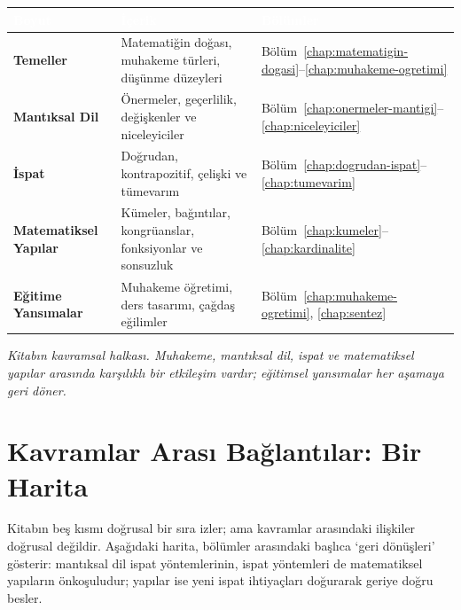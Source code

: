 \par\smallskip\begin{center}{\renewcommand{\arraystretch}{1.25}\footnotesize\begin{tabular}{|>{\raggedright\arraybackslash}p{2.59cm}|>{\raggedright\arraybackslash}p{5.43cm}|>{\raggedright\arraybackslash}p{2.10cm}|}\hline
\rowcolor{cAcc}\textcolor{white}{\bfseries Boyut} & \textcolor{white}{\bfseries İçerik} & \textcolor{white}{\bfseries Bölümler} \\ \hline
\textbf{Temeller} & Matematiğin doğası, muhakeme türleri, düşünme düzeyleri & Bölüm~\ref{chap:matematigin-dogasi}--\ref{chap:muhakeme-ogretimi} \\ \hline
\textbf{Mantıksal Dil} & Önermeler, geçerlilik, değişkenler ve niceleyiciler & Bölüm~\ref{chap:onermeler-mantigi}--\ref{chap:niceleyiciler} \\ \hline
\textbf{İspat} & Doğrudan, kontrapozitif, çelişki ve tümevarım & Bölüm~\ref{chap:dogrudan-ispat}--\ref{chap:tumevarim} \\ \hline
\textbf{Matematiksel Yapılar} & Kümeler, bağıntılar, kongrüanslar, fonksiyonlar ve sonsuzluk & Bölüm~\ref{chap:kumeler}--\ref{chap:kardinalite} \\ \hline
\textbf{Eğitime Yansımalar} & Muhakeme öğretimi, ders tasarımı, çağdaş eğilimler & Bölüm~\ref{chap:muhakeme-ogretimi}, \ref{chap:sentez} \\ \hline
\end{tabular}}\end{center}\par\smallskip

{\small\itshape\sffamily\color{gray}Kitabın kavramsal halkası. Muhakeme, mantıksal dil, ispat ve matematiksel yapılar arasında karşılıklı bir etkileşim vardır; eğitimsel yansımalar her aşamaya geri döner.}

\section{Kavramlar Arası Bağlantılar: Bir Harita}

Kitabın beş kısmı doğrusal bir sıra izler; ama kavramlar arasındaki ilişkiler doğrusal değildir. Aşağıdaki harita, bölümler arasındaki başlıca ‘geri dönüşleri’ gösterir: mantıksal dil ispat yöntemlerinin, ispat yöntemleri de matematiksel yapıların önkoşuludur; yapılar ise yeni ispat ihtiyaçları doğurarak geriye doğru besler.

